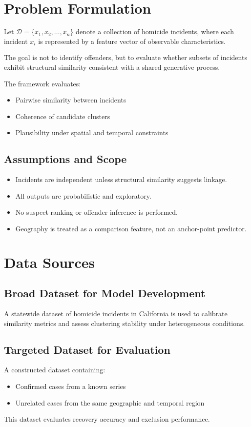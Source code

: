 \documentclass[12pt]{article}
\begin{document}
\section{Problem Formulation}

Let $\mathcal{D} = \{x_1, x_2, \dots, x_n\}$ denote a collection of homicide incidents, where each incident $x_i$ is represented by a feature vector of observable characteristics.

The goal is not to identify offenders, but to evaluate whether subsets of incidents exhibit structural similarity consistent with a shared generative process.

The framework evaluates:
\begin{itemize}
    \item Pairwise similarity between incidents
    \item Coherence of candidate clusters
    \item Plausibility under spatial and temporal constraints
\end{itemize}

\subsection{Assumptions and Scope}
\begin{itemize}
    \item Incidents are independent unless structural similarity suggests linkage.
    \item All outputs are probabilistic and exploratory.
    \item No suspect ranking or offender inference is performed.
    \item Geography is treated as a comparison feature, not an anchor-point predictor.
\end{itemize}

\section{Data Sources}

\subsection{Broad Dataset for Model Development}
A statewide dataset of homicide incidents in California is used to calibrate similarity metrics and assess clustering stability under heterogeneous conditions.

\subsection{Targeted Dataset for Evaluation}
A constructed dataset containing:
\begin{itemize}
    \item Confirmed cases from a known series
    \item Unrelated cases from the same geographic and temporal region
\end{itemize}
This dataset evaluates recovery accuracy and exclusion performance.
\end{document}
